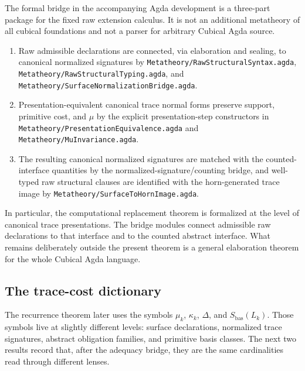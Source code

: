 \begin{remark}
The formal bridge in the accompanying Agda development is a three-part package for the
fixed raw extension calculus.  It is not an additional metatheory of all cubical foundations
and not a parser for arbitrary Cubical Agda source.

\begin{enumerate}
\item Raw admissible declarations are connected, via elaboration and sealing, to canonical
normalized signatures by
\texttt{Metatheory/RawStructuralSyntax.agda},
\texttt{Metatheory/RawStructuralTyping.agda}, and
\texttt{Metatheory/SurfaceNormalizationBridge.agda}.

\item Presentation-equivalent canonical trace normal forms preserve support, primitive cost,
and \(\mu\) by the explicit presentation-step constructors in
\texttt{Metatheory/PresentationEquivalence.agda} and
\texttt{Metatheory/MuInvariance.agda}.

\item The resulting canonical normalized signatures are matched with the counted-interface
quantities by the normalized-signature/counting bridge, and well-typed raw structural clauses
are identified with the horn-generated trace image by
\texttt{Metatheory/SurfaceToHornImage.agda}.
\end{enumerate}

In particular, the computational replacement theorem is formalized at the level of canonical
trace presentations.  The bridge modules connect admissible raw declarations to that
interface and to the counted abstract interface.  What remains deliberately outside the
present theorem is a general elaboration theorem for the whole Cubical Agda language.
\end{remark}

\subsection{The trace-cost dictionary}

The recurrence theorem later uses the symbols \(\mu_k\), \(\kappa_k\), \(\Delta\), and
\(S_{\mathrm{bas}}(L_k)\).  Those symbols live at slightly different levels: surface
declarations, normalized trace signatures, abstract obligation families, and primitive basis
classes.  The next two results record that, after the adequacy bridge, they are the same
cardinalities read through different lenses.

